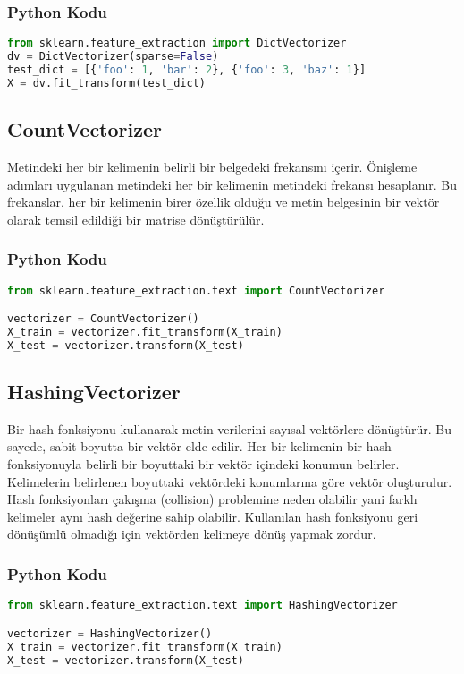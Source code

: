 \subsubsection{Python Kodu}

\begin{lstlisting}[language=Python]
from sklearn.feature_extraction import DictVectorizer
dv = DictVectorizer(sparse=False)
test_dict = [{'foo': 1, 'bar': 2}, {'foo': 3, 'baz': 1}]
X = dv.fit_transform(test_dict)
\end{lstlisting}

\newpage

\subsection{CountVectorizer}
Metindeki her bir kelimenin belirli bir belgedeki frekansını içerir. Önişleme adımları uygulanan metindeki her bir kelimenin metindeki frekansı hesaplanır. Bu frekanslar, her bir kelimenin birer özellik olduğu ve metin belgesinin bir vektör olarak temsil edildiği bir matrise dönüştürülür.

\subsubsection{Python Kodu}

\begin{lstlisting}[language=Python]
from sklearn.feature_extraction.text import CountVectorizer

vectorizer = CountVectorizer()
X_train = vectorizer.fit_transform(X_train)
X_test = vectorizer.transform(X_test)
\end{lstlisting}

\newpage

\subsection{HashingVectorizer}
Bir hash fonksiyonu kullanarak metin verilerini sayısal vektörlere dönüştürür. Bu sayede, sabit boyutta bir vektör elde edilir. Her bir kelimenin bir hash fonksiyonuyla belirli bir boyuttaki bir vektör içindeki konumun belirler. Kelimelerin belirlenen boyuttaki vektördeki konumlarına göre vektör oluşturulur. Hash fonksiyonları çakışma (collision) problemine neden olabilir yani farklı kelimeler aynı hash değerine sahip olabilir. Kullanılan hash fonksiyonu geri dönüşümlü olmadığı için vektörden kelimeye dönüş yapmak zordur.

\subsubsection{Python Kodu}

\begin{lstlisting}[language=Python]
from sklearn.feature_extraction.text import HashingVectorizer

vectorizer = HashingVectorizer()
X_train = vectorizer.fit_transform(X_train)
X_test = vectorizer.transform(X_test)
\end{lstlisting}

\newpage